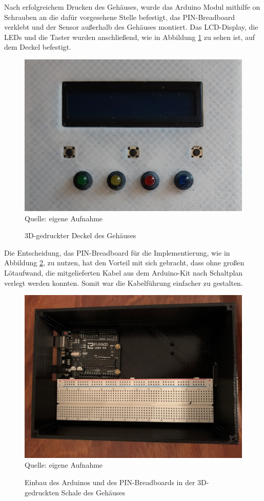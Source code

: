 \label{Hardwareimpl}

Nach erfolgreichem Drucken des Gehäuses, wurde das Arduino Modul mithilfe on Schrauben an die dafür vorgesehene Stelle befestigt, das PIN-Breadboard verklebt und der Sensor außerhalb des Gehäuses montiert. Das \ac{LCD}-Display, die \ac{LED}s und die Taster wurden anschließend, wie in Abbildung \ref{fig:Deckel} zu sehen ist, auf dem Deckel befestigt.

\begin{figure}[!hbt]
	\centering
	\includegraphics[width=0.3\linewidth]{Images/Deckel}
	\footnotesize \\Quelle: eigene Aufnahme
	\caption{3D-gedruckter Deckel des Gehäuses}
	\label{fig:Deckel}
\end{figure}

Die Entscheidung, das PIN-Breadboard für die Implementierung, wie in Abbildung \ref{fig:Einbau_AuB}, zu nutzen, hat den Vorteil mit sich gebracht, dass ohne großen Lötaufwand, die mitgelieferten Kabel aus dem Arduino-Kit nach Schaltplan verlegt werden konnten. Somit war die Kabelführung einfacher zu gestalten.

\begin{figure}[!hbt]
	\centering
	\includegraphics[width=0.3\linewidth]{Images/Einbau_AuB}
	\footnotesize \\Quelle: eigene Aufnahme
	\caption{Einbau des Arduinos und des PIN-Breadboards in der 3D-gedruckten Schale des Gehäuses}
	\label{fig:Einbau_AuB}
\end{figure}